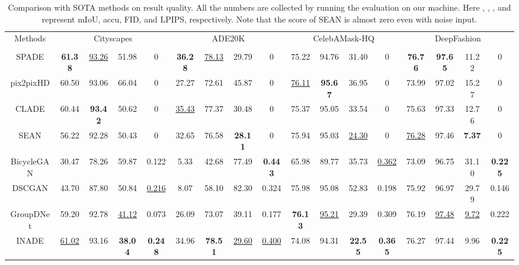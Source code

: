 \documentclass[final]{cvpr}
\begin{document}
\begin{table*}[t]
\setlength{\tabcolsep}{1.6mm}
    \centering
    \caption{Comparison with SOTA methods on result quality. All the numbers are collected by running the evaluation on our machine. Here , , , and  represent mIoU, accu, FID, and LPIPS, respectively. Note that the  score of SEAN is almost zero even with noise input.}
\footnotesize
    \begin{tabular}{c|c|c|c|c|c|c|c|c|c|c|c|c|c|c|c|c}
    \hline
        \multirow{2}{*}{Methods} & \multicolumn{4}{c|}{Cityscapes} & \multicolumn{4}{c|}{ADE20K} & \multicolumn{4}{c|}{CelebAMask-HQ} & \multicolumn{4}{c}{DeepFashion}\\
        \cline{2-17}
         &   &   &   &   &   &   &   &   &   &   &   &   &   &   &   &  \\
        \hline
        SPADE & \textbf{61.38} & \underline{93.26} & 51.98 & 0 & \textbf{36.28} & \underline{78.13} & 29.79 & 0 & 75.22 & 94.76 & 31.40 & 0 & \textbf{76.76} & \textbf{97.65} & 11.22 & 0\\
        \hline
        pix2pixHD & 60.50 & 93.06 & 66.04 & 0 & 27.27 & 72.61 & 45.87 & 0 & \underline{76.11} & \textbf{95.67} & 36.95 & 0 & 73.99 & 97.02 & 15.27 & 0\\
        \hline
        CLADE & 60.44 & \textbf{93.42} & 50.62 & 0 & \underline{35.43} & 77.37 & 30.48 & 0 & 75.37 & 95.05 & 33.54 & 0 & 75.63 & 97.33 & 12.76 & 0\\
        \hline
        SEAN & 56.22 & 92.28 & 50.43 & 0 & 32.65 & 76.58 & \textbf{28.11} & 0 & 75.94 & 95.03 & \underline{24.30} & 0 & \underline{76.28} & 97.46 & \textbf{7.37} & 0\\
        \hline
        BicycleGAN & 30.47 & 78.26 & 59.87 & 0.122 & 5.33 & 42.68 & 77.49 & \textbf{0.443} & 65.98 & 89.77 & 35.73 & \underline{0.362} & 73.09 & 96.75 & 31.10 & \textbf{0.225}\\
        \hline
        DSCGAN & 43.70 & 87.80 & 50.84 & \underline{0.216} & 8.07 & 58.10 & 82.30 & 0.324 & 75.98 & 95.08 & 52.83 & 0.198 & 75.92 & 96.97 & 29.79 & 0.146\\
        \hline
        GroupDNet & 59.20 & 92.78 & \underline{41.12} & 0.073 & 26.09 & 73.07 & 39.11 & 0.177 & \textbf{76.13} & \underline{95.21} & 29.39 & 0.309 & 76.19 & \underline{97.48} & \underline{9.72} & 0.222\\
        \hline
        INADE & \underline{61.02} & 93.16 & \textbf{38.04} & \textbf{0.248} & 34.96 & \textbf{78.51} & \underline{29.60} & \underline{0.400} & 74.08 & 94.31 & \textbf{22.55} & \textbf{0.365} & 76.27 & 97.44 & 9.96 & \textbf{0.225}\\
        \hline
    \end{tabular}
    \label{tab:comp_quality}
\end{table*}{}
\end{document}
